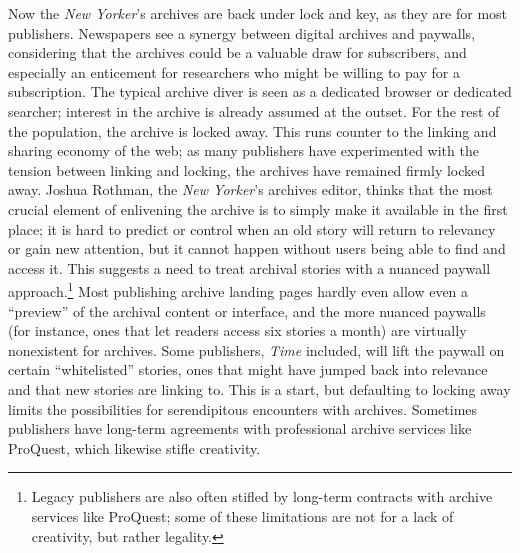 Now the \emph{New Yorker}'s archives are back under lock and key, as they are for most publishers. Newspapers see a synergy between digital archives and paywalls, considering that the archives could be a valuable draw for subscribers, and especially an enticement for researchers who might be willing to pay for a subscription. The typical archive diver is seen as a dedicated browser or dedicated searcher; interest in the archive is already assumed at the outset. For the rest of the population, the archive is locked away. This runs counter to the linking and sharing economy of the web; as many publishers have experimented with the tension between linking and locking, the archives have remained firmly locked away. Joshua Rothman, the \emph{New Yorker}'s archives editor, thinks that the most crucial element of enlivening the archive is to simply make it available in the first place; it is hard to predict or control when an old story will return to relevancy or gain new attention, but it cannot happen without users being able to find and access it.\autocite{rothman_interview_2015} This suggests a need to treat archival stories with a nuanced paywall approach.\footnote{Legacy publishers are also often stifled by long-term contracts with archive services like ProQuest; some of these limitations are not for a lack of creativity, but rather legality.} Most publishing archive landing pages hardly even allow even a ``preview'' of the archival content or interface, and the more nuanced paywalls (for instance, ones that let readers access six stories a month) are virtually nonexistent for archives. Some publishers, \emph{Time} included, will lift the paywall on certain ``whitelisted'' stories, ones that might have jumped back into relevance and that new stories are linking to. This is a start, but defaulting to locking away limits the possibilities for serendipitous encounters with archives. Sometimes publishers have long-term agreements with professional archive services like ProQuest, which likewise stifle creativity.

